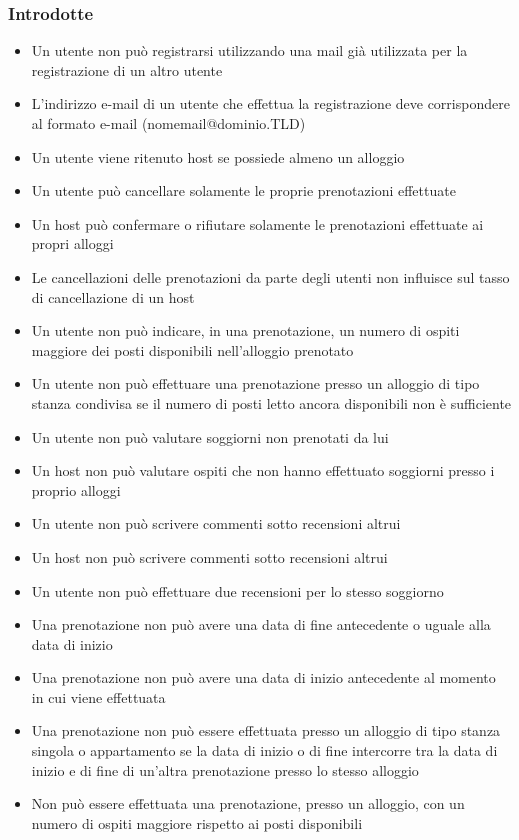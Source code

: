 \subsubsection{Introdotte}
\begin{itemize}
  \item Un utente non può registrarsi utilizzando una mail già utilizzata per la registrazione di un altro utente
  \item L'indirizzo e-mail di un utente che effettua la registrazione deve corrispondere al formato e-mail (nomemail@dominio.TLD)
  \item Un utente viene ritenuto host se possiede almeno un alloggio
  \item Un utente può cancellare solamente le proprie prenotazioni effettuate
  \item Un host può confermare o rifiutare solamente le prenotazioni effettuate ai propri alloggi
  \item Le cancellazioni delle prenotazioni da parte degli utenti non influisce sul tasso di cancellazione di un host
  \item Un utente non può indicare, in una prenotazione, un numero di ospiti maggiore dei posti disponibili nell'alloggio prenotato
  \item Un utente non può effettuare una prenotazione presso un alloggio di tipo stanza condivisa se il numero di posti letto ancora disponibili non è sufficiente
  \item Un utente non può valutare soggiorni non prenotati da lui
  \item Un host non può valutare ospiti che non hanno effettuato soggiorni presso i proprio alloggi
  \item Un utente non può scrivere commenti sotto recensioni altrui
  \item Un host non può scrivere commenti sotto recensioni altrui
  \item Un utente non può effettuare due recensioni per lo stesso soggiorno
  \item Una prenotazione non può avere una data di fine antecedente o uguale alla data di inizio
  \item Una prenotazione non può avere una data di inizio antecedente al momento in cui viene effettuata
  \item Una prenotazione non può essere effettuata presso un alloggio di tipo stanza singola o appartamento se la data di inizio o di fine intercorre tra la data di inizio e di fine di un'altra prenotazione presso lo stesso alloggio
  \item Non può essere effettuata una prenotazione, presso un alloggio, con un numero di ospiti maggiore rispetto ai posti disponibili
\end{itemize}